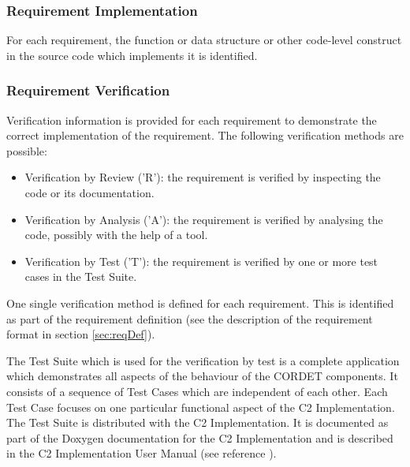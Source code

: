 \documentclass{pnp_article}
\begin{document}
\subsubsection{Requirement Implementation}
For each requirement, the function or data structure or other code-level construct in the source code which implements it is identified.

\subsubsection{Requirement Verification}\label{sec:reqVer}
Verification information is provided for each requirement to demonstrate the correct implementation of the requirement. The following verification methods are possible:

\begin{itemize}
\item Verification by Review ('R'): the requirement is verified by inspecting the code or its documentation.
\item Verification by Analysis ('A'): the requirement is verified by analysing the code, possibly with the help of a tool.
\item Verification by Test ('T'): the requirement is verified by one or more test cases in the Test Suite.
\end{itemize}

One single verification method is defined for each requirement. 
This is identified as part of the requirement definition (see the description of the requirement format in section \ref{sec:reqDef}).

The Test Suite which is used for the verification by test is a complete application which demonstrates all aspects of the behaviour of the CORDET components. It consists of a sequence of Test Cases which are independent of each other. Each Test Case focuses on one particular functional aspect of the C2 Implementation. The Test Suite is distributed with the C2 Implementation. It is documented as part of the Doxygen documentation for the C2 Implementation and is described in the C2 Implementation User Manual (see reference \cite{ref:C2Implementation}).


\let\stdsubsection\subsection
\renewcommand\subsection{\newpage\stdsubsection}
\end{document}
